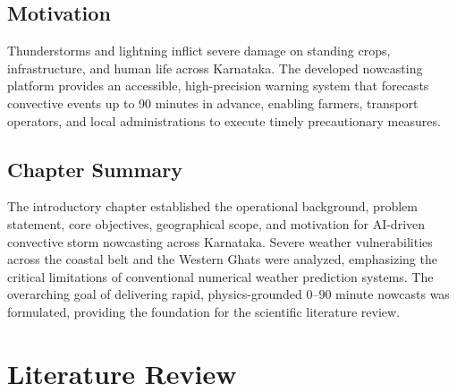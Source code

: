 \documentclass[12pt,a4paper]{report}
\begin{document}
\section{Motivation}
Thunderstorms and lightning inflict severe damage on standing crops, infrastructure, and human life across Karnataka. The developed nowcasting platform provides an accessible, high-precision warning system that forecasts convective events up to 90 minutes in advance, enabling farmers, transport operators, and local administrations to execute timely precautionary measures.

\section{Chapter Summary}
The introductory chapter established the operational background, problem statement, core objectives, geographical scope, and motivation for AI-driven convective storm nowcasting across Karnataka. Severe weather vulnerabilities across the coastal belt and the Western Ghats were analyzed, emphasizing the critical limitations of conventional numerical weather prediction systems. The overarching goal of delivering rapid, physics-grounded $0$--$90$ minute nowcasts was formulated, providing the foundation for the scientific literature review.

\chapter{Literature Review}
\thispagestyle{empty}
\end{document}
